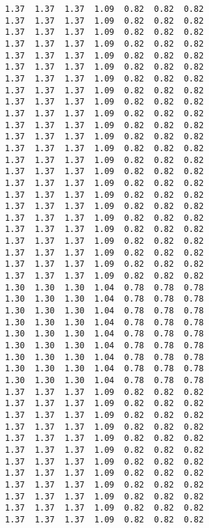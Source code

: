 \begin{lstlisting}
1.37  1.37  1.37  1.09  0.82  0.82  0.82
1.37  1.37  1.37  1.09  0.82  0.82  0.82
1.37  1.37  1.37  1.09  0.82  0.82  0.82
1.37  1.37  1.37  1.09  0.82  0.82  0.82
1.37  1.37  1.37  1.09  0.82  0.82  0.82
1.37  1.37  1.37  1.09  0.82  0.82  0.82
1.37  1.37  1.37  1.09  0.82  0.82  0.82
1.37  1.37  1.37  1.09  0.82  0.82  0.82
1.37  1.37  1.37  1.09  0.82  0.82  0.82
1.37  1.37  1.37  1.09  0.82  0.82  0.82
1.37  1.37  1.37  1.09  0.82  0.82  0.82
1.37  1.37  1.37  1.09  0.82  0.82  0.82
1.37  1.37  1.37  1.09  0.82  0.82  0.82
1.37  1.37  1.37  1.09  0.82  0.82  0.82
1.37  1.37  1.37  1.09  0.82  0.82  0.82
1.37  1.37  1.37  1.09  0.82  0.82  0.82
1.37  1.37  1.37  1.09  0.82  0.82  0.82
1.37  1.37  1.37  1.09  0.82  0.82  0.82
1.37  1.37  1.37  1.09  0.82  0.82  0.82
1.37  1.37  1.37  1.09  0.82  0.82  0.82
1.37  1.37  1.37  1.09  0.82  0.82  0.82
1.37  1.37  1.37  1.09  0.82  0.82  0.82
1.37  1.37  1.37  1.09  0.82  0.82  0.82
1.37  1.37  1.37  1.09  0.82  0.82  0.82
1.30  1.30  1.30  1.04  0.78  0.78  0.78
1.30  1.30  1.30  1.04  0.78  0.78  0.78
1.30  1.30  1.30  1.04  0.78  0.78  0.78
1.30  1.30  1.30  1.04  0.78  0.78  0.78
1.30  1.30  1.30  1.04  0.78  0.78  0.78
1.30  1.30  1.30  1.04  0.78  0.78  0.78
1.30  1.30  1.30  1.04  0.78  0.78  0.78
1.30  1.30  1.30  1.04  0.78  0.78  0.78
1.30  1.30  1.30  1.04  0.78  0.78  0.78
1.37  1.37  1.37  1.09  0.82  0.82  0.82
1.37  1.37  1.37  1.09  0.82  0.82  0.82
1.37  1.37  1.37  1.09  0.82  0.82  0.82
1.37  1.37  1.37  1.09  0.82  0.82  0.82
1.37  1.37  1.37  1.09  0.82  0.82  0.82
1.37  1.37  1.37  1.09  0.82  0.82  0.82
1.37  1.37  1.37  1.09  0.82  0.82  0.82
1.37  1.37  1.37  1.09  0.82  0.82  0.82
1.37  1.37  1.37  1.09  0.82  0.82  0.82
1.37  1.37  1.37  1.09  0.82  0.82  0.82
1.37  1.37  1.37  1.09  0.82  0.82  0.82
1.37  1.37  1.37  1.09  0.82  0.82  0.82


\end{lstlisting}
